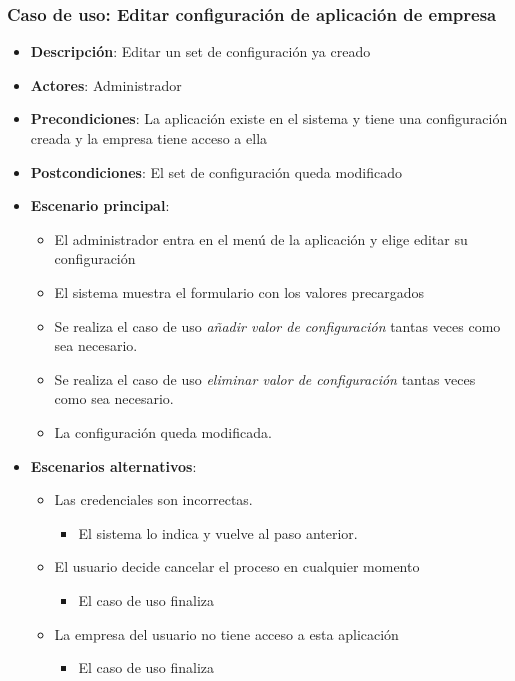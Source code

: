 \documentclass[12pt,a4paperpaper,]{report}
\providecommand{\tightlist}{%
  \setlength{\itemsep}{0pt}\setlength{\parskip}{0pt}}
\begin{document}
\subsubsection{Caso de uso: Editar configuración de aplicación de
empresa}\label{caso-de-uso-editar-configuraciuxf3n-de-aplicaciuxf3n-de-empresa}

\begin{itemize}
\tightlist
\item
  \textbf{Descripción}: Editar un set de configuración ya creado
\item
  \textbf{Actores}: Administrador
\item
  \textbf{Precondiciones}: La aplicación existe en el sistema y tiene
  una configuración creada y la empresa tiene acceso a ella
\item
  \textbf{Postcondiciones}: El set de configuración queda modificado
\item
  \textbf{Escenario principal}:

  \begin{itemize}
  \tightlist
  \item
    El administrador entra en el menú de la aplicación y elige editar su
    configuración
  \item
    El sistema muestra el formulario con los valores precargados
  \item
    Se realiza el caso de uso \emph{añadir valor de configuración}
    tantas veces como sea necesario.
  \item
    Se realiza el caso de uso \emph{eliminar valor de configuración}
    tantas veces como sea necesario.
  \item
    La configuración queda modificada.
  \end{itemize}
\item
  \textbf{Escenarios alternativos}:

  \begin{itemize}
  \tightlist
  \item
    Las credenciales son incorrectas.

    \begin{itemize}
    \tightlist
    \item
      El sistema lo indica y vuelve al paso anterior.
    \end{itemize}
  \item
    El usuario decide cancelar el proceso en cualquier momento

    \begin{itemize}
    \tightlist
    \item
      El caso de uso finaliza
    \end{itemize}
  \item
    La empresa del usuario no tiene acceso a esta aplicación

    \begin{itemize}
    \tightlist
    \item
      El caso de uso finaliza
    \end{itemize}
  \end{itemize}
\end{itemize}
\end{document}
